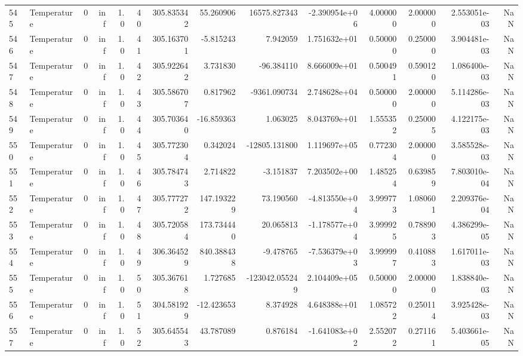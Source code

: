 \begin{tabular}{llrrrrrrrrrrrr}
545 &  Temperature &       0 &  inf &  1.0 &   40 &  305.835342 &    55.260906 &   16575.827343 & -2.390954e+06 &  4.000000 &  2.000000 &  2.553051e-03 &      NaN \\
546 &  Temperature &       0 &  inf &  1.0 &   41 &  305.163701 &    -5.815243 &       7.942059 &  1.751632e+01 &  0.500000 &  0.250000 &  3.904481e-03 &      NaN \\
547 &  Temperature &       0 &  inf &  1.0 &   42 &  305.922642 &     3.731830 &     -96.384110 &  8.666009e+01 &  0.500491 &  0.590120 &  1.086400e-03 &      NaN \\
548 &  Temperature &       0 &  inf &  1.0 &   43 &  305.586707 &     0.817962 &   -9361.090734 &  2.748628e+04 &  0.500000 &  2.000000 &  5.114286e-03 &      NaN \\
549 &  Temperature &       0 &  inf &  1.0 &   44 &  305.703640 &   -16.859363 &       1.063025 &  8.043769e+01 &  1.555352 &  0.250005 &  4.122175e-03 &      NaN \\
550 &  Temperature &       0 &  inf &  1.0 &   45 &  305.772304 &     0.342024 &  -12805.131800 &  1.119697e+05 &  0.772304 &  2.000000 &  3.585528e-03 &      NaN \\
551 &  Temperature &       0 &  inf &  1.0 &   46 &  305.784743 &     2.714822 &      -3.151837 &  7.203502e+00 &  1.485254 &  0.639859 &  7.803010e-04 &      NaN \\
552 &  Temperature &       0 &  inf &  1.0 &   47 &  305.777272 &   147.193229 &      73.190560 & -4.813550e+04 &  3.999773 &  1.080601 &  2.209376e-04 &      NaN \\
553 &  Temperature &       0 &  inf &  1.0 &   48 &  305.720584 &   173.734440 &      20.065813 & -1.178577e+04 &  3.999925 &  0.788903 &  4.386299e-05 &      NaN \\
554 &  Temperature &       0 &  inf &  1.0 &   49 &  306.364529 &   840.388438 &      -9.478765 & -7.536379e+03 &  3.999997 &  0.410883 &  1.617011e-03 &      NaN \\
555 &  Temperature &       0 &  inf &  1.0 &   50 &  305.367618 &     1.727685 & -123042.055249 &  2.104409e+05 &  0.500000 &  2.000000 &  1.838840e-03 &      NaN \\
556 &  Temperature &       0 &  inf &  1.0 &   51 &  304.581929 &   -12.423653 &       8.374928 &  4.648388e+01 &  1.085722 &  0.250114 &  3.925428e-03 &      NaN \\
557 &  Temperature &       0 &  inf &  1.0 &   52 &  305.645543 &    43.787089 &       0.876184 & -1.641083e+02 &  2.552072 &  0.271161 &  5.403661e-05 &      NaN \\

\end{tabular}

